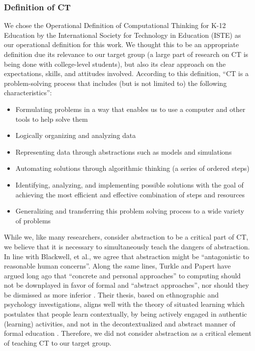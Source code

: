 \documentclass{acm_proc_article-sp}
\begin{document}
\subsubsection{Definition of CT}
We chose the Operational Definition of Computational Thinking for K-12 Education by the International Society for Technology in Education (ISTE) \cite{operationalct} as our operational definition for this work. 
We thought this to be an appropriate definition due its relevance to our target group (a large part of research on CT is being done with college-level students), but also its clear approach on the expectations, skills, and attitudes involved. 
According to this definition, ``CT is a problem-solving process that includes (but is not limited to) the following characteristics'': 
\begin{itemize}
  \item{Formulating problems in a way that enables us to use a computer and other tools to help solve them}
  \item{Logically organizing and analyzing data}
  \item{Representing data through abstractions such as models and simulations}
  \item{Automating solutions through algorithmic thinking (a series of ordered steps)}
  \item{Identifying, analyzing, and implementing possible solutions with the goal of achieving the most efficient and effective combination of steps and resources}
  \item{Generalizing and transferring this problem solving process to a wide variety of problems}
\end{itemize}
While we, like many researchers, consider abstraction to be a critical part of CT, we believe that it is necessary to simultaneously teach the dangers of abstraction. 
In line with Blackwell, et al., we agree that abstraction might be ``antagonistic to reasonable human concerns''\cite{blackwell2008abstract}. 
Along the same lines, Turkle and Papert have argued long ago that ``concrete and personal approaches'' to computing should not be downplayed in favor of formal and ``abstract approaches'', nor should they be dismissed as more inferior \cite{turkle1990epistemological}. 
Their thesis, based on ethnographic and psychology investigations, aligns well with the theory of situated learning which postulates that people learn contextually, by being actively engaged in authentic (learning) activities, and not in the decontextualized and abstract manner of formal education \cite{brown1989situated}. 
Therefore, we did not consider abstraction as a critical element of teaching CT to our target group.
\end{document}
